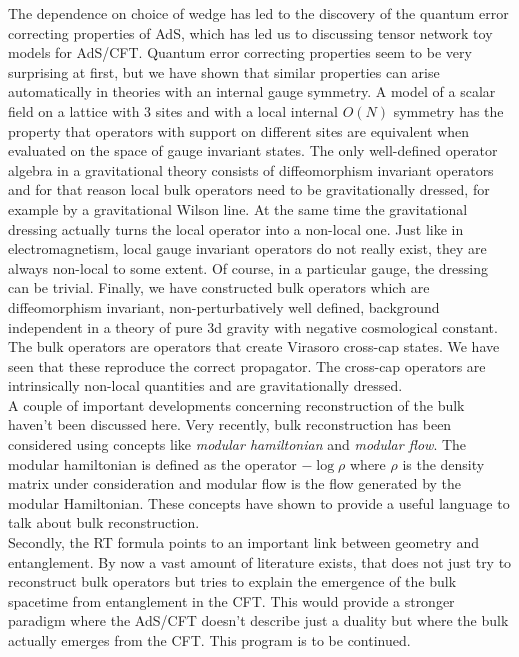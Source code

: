 \documentclass{PoS}
\begin{document}
The dependence on choice of wedge has led to the discovery of the quantum error correcting properties of AdS, which has led us to discussing tensor network toy models for AdS/CFT. Quantum error correcting properties seem to be very surprising at first, but we have shown that similar properties can arise automatically in theories with an internal gauge symmetry. A model of a scalar field on a lattice with $3$ sites and with a local internal $O(N)$ symmetry  has the property that operators with support on different sites are equivalent when evaluated on the space of gauge invariant states. The only well-defined operator algebra in a gravitational theory consists of diffeomorphism invariant operators and for that reason local bulk operators need to be gravitationally dressed, for example by a gravitational Wilson line. At the same time the gravitational dressing actually turns the local operator into a non-local one. Just like in electromagnetism, local gauge invariant operators do not really exist, they are always non-local to some extent. Of course, in a particular gauge, the dressing can be trivial. Finally, we have constructed bulk operators which are diffeomorphism invariant, non-perturbatively well defined, background independent in a theory of pure 3d gravity with negative cosmological constant. The bulk operators are operators that create Virasoro cross-cap states. We have seen that these reproduce the correct propagator. The cross-cap operators are intrinsically non-local quantities and are gravitationally dressed.\\

A couple of important developments concerning reconstruction of the bulk haven't been discussed here. Very recently, bulk reconstruction has been considered using concepts like \textit{modular hamiltonian} and \textit{modular flow}\cite{Faulkner:2017vdd}. The modular hamiltonian is defined as the operator $-\log \rho$ where $\rho$ is the density matrix under consideration and modular flow is the flow generated by the modular Hamiltonian. These concepts have shown to provide a useful language to talk about bulk reconstruction.\\

Secondly, the RT formula points to an important link between geometry and entanglement. By now a vast amount of literature exists, that does not just try to reconstruct bulk operators but tries to explain the emergence of the bulk spacetime from entanglement in the CFT. This would provide a stronger paradigm where the AdS/CFT doesn't describe  just a duality but where the bulk actually emerges from the CFT. This program is to be continued.\\
\end{document}
